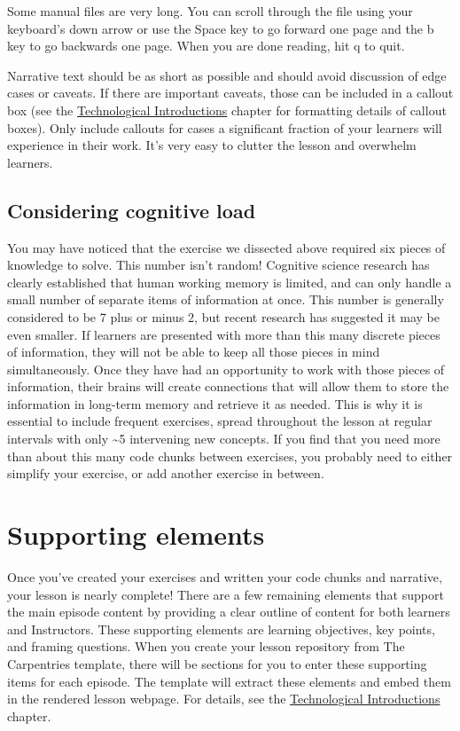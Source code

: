 \documentclass[
]{book}
\begin{document}
Some manual files are very long. You can scroll through the file using
your keyboard's down arrow or use the Space key to go forward one page
and the b key to go backwards one page. When you are done reading, hit q
to quit.

Narrative text should be as short as possible and should avoid discussion of edge cases or caveats. If there
are important caveats, those can be included in a callout box (see the
\protect\hyperlink{technological-introductions}{Technological Introductions}
chapter for formatting details of callout boxes). Only include callouts for cases a significant fraction of your
learners will experience in their work. It's very easy to clutter the lesson and overwhelm learners.

\hypertarget{considering-cognitive-load}{%
\subsection{Considering cognitive load}\label{considering-cognitive-load}}

You may have noticed that the exercise we dissected above required six pieces of knowledge to solve.
This number isn't random! Cognitive science research has clearly established that human working memory is
limited, and can only handle a small number of separate items of information at once. This number is generally
considered to be 7 plus or minus 2, but recent research has suggested it may be even smaller. If learners are
presented with more than this many discrete pieces of information, they will not be able to keep all those
pieces in mind simultaneously. Once they have had an opportunity to work with those pieces of information, their
brains will create connections that will allow them to store the information in long-term memory and retrieve it
as needed. This is why it is essential to include frequent exercises, spread throughout the lesson at regular
intervals with only \textasciitilde5 intervening new concepts. If you find that you need more than about this many code chunks
between exercises, you probably need to either simplify your exercise, or add another exercise in between.

\hypertarget{supporting-elements}{%
\section{Supporting elements}\label{supporting-elements}}

Once you've created your exercises and written your code chunks and narrative, your lesson is nearly complete!
There are a few remaining elements that support the main episode content by providing a clear outline
of content for both learners and Instructors. These supporting elements are learning objectives, key points, and
framing questions. When you create your lesson repository from The Carpentries template, there will be sections
for you to enter these supporting items for each episode. The template will extract these elements and embed
them in the rendered lesson webpage. For details, see the
\protect\hyperlink{technological-introductions}{Technological Introductions} chapter.
\end{document}
